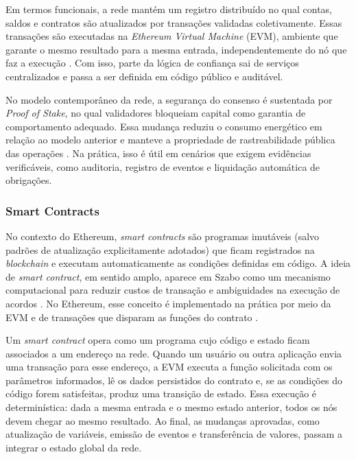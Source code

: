 Em termos funcionais, a rede mantém um registro distribuído no qual contas, saldos e contratos
são atualizados por transações validadas coletivamente. Essas transações são executadas
na \emph{Ethereum Virtual Machine} (EVM), ambiente que garante o mesmo resultado para a
mesma entrada, independentemente do nó que faz a execução \cite{wood2014yellowpaper}. Com isso, parte da
lógica de confiança sai de serviços centralizados e passa a ser definida em código público
e auditável.

No modelo contemporâneo da rede, a segurança do consenso é sustentada por \emph{Proof of
Stake}, no qual validadores bloqueiam capital como garantia de comportamento adequado.
Essa mudança reduziu o consumo energético em relação ao modelo anterior e manteve a
propriedade de rastreabilidade pública das operações \cite{ethereumfoundation2026pos}. Na prática, isso é útil em
cenários que exigem evidências verificáveis, como auditoria, registro de eventos e
liquidação automática de obrigações.

\subsubsection{Smart Contracts}

No contexto do Ethereum, \emph{smart contracts} são programas imutáveis (salvo padrões de
atualização explicitamente adotados) que ficam registrados na \emph{blockchain} e executam automaticamente
as condições definidas em código. A ideia de \emph{smart contract}, em sentido amplo,
aparece em Szabo como um mecanismo computacional para reduzir custos de transação
e ambiguidades na execução de acordos \cite{szabo1997formalizing}. No Ethereum, esse conceito é implementado
na prática por meio da EVM e de transações que disparam as funções do contrato \cite{wood2014yellowpaper}.

Um \emph{smart contract} opera como um programa cujo código e
estado ficam associados a um endereço na rede. Quando um usuário ou outra aplicação
envia uma transação para esse endereço, a EVM executa a função solicitada com os
parâmetros informados, lê os dados persistidos do contrato e, se as condições do código
forem satisfeitas, produz uma transição de estado. Essa execução é determinística: dada
a mesma entrada e o mesmo estado anterior, todos os nós devem chegar ao mesmo resultado.
Ao final, as mudanças aprovadas, como atualização de variáveis, emissão de eventos e
transferência de valores, passam a integrar o estado global da rede.

